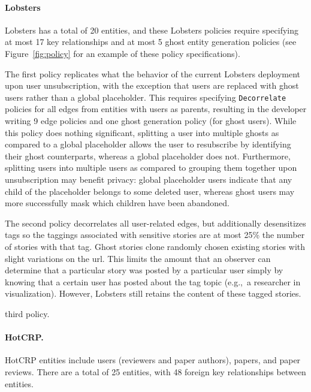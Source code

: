 \paragraph{Lobsters}
Lobsters has a total of 20 entities, and 
these Lobsters policies require specifying at most 17 key
relationships and at most 5 ghost entity generation policies (see Figure~\ref{fig:policy} for an example
of these policy specifications).

The first policy replicates what the behavior of the current Lobsters deployment upon user
unsubscription, with the exception that users are replaced with ghost users rather than a global
placeholder. This requires specifying \texttt{Decorrelate} policies for all edges from entities with users
as parents, resulting in the developer writing 9 edge policies and one ghost generation policy (for
ghost users). While this policy does nothing significant, splitting a user into multiple ghosts as
compared to a global placeholder allows the user to resubscribe by identifying their ghost
counterparts, whereas a global placeholder does not. Furthermore, splitting users into multiple
users as compared to grouping them together upon unsubscription may benefit privacy: global
placeholder users indicate that any child of the placeholder belongs to some deleted user, whereas
ghost users may more successfully mask which children have been abandoned.

The second policy decorrelates all user-related edges, but additionally desensitizes tags so the
taggings associated with sensitive stories are at most 25\% the number of stories with that tag.
Ghost stories clone randomly chosen existing stories with slight variations on the url.
This limits the amount that an observer can determine that a particular story was posted by a
particular user simply by knowing that a certain user has posted about the tag topic (e.g.,\ a researcher 
in visualization). However, Lobsters still retains the content of these tagged stories.

 third policy.

\paragraph{HotCRP.}
HotCRP entities include users (reviewers and paper authors), papers, and paper reviews. There are a total of 25
entities, with 48 foreign key relationships between entities.

